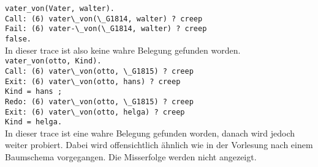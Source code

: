 \documentclass[11pt]{article}
\begin{document}
\verb|vater_von(Vater, walter).|\\
\verb|Call: (6) vater\_von(\_G1814, walter) ? creep|\\
\verb|Fail: (6) vater-\_von(\_G1814, walter) ? creep|\\
\verb|false.|\\

In dieser trace ist also keine wahre Belegung gefunden worden.\\

\verb|vater_von(otto, Kind).|\\
\verb|Call: (6) vater\_von(otto, \_G1815) ? creep|\\
\verb|Exit: (6) vater\_von(otto, hans) ? creep|\\
\verb|Kind = hans ;|\\
\verb|Redo: (6) vater\_von(otto, \_G1815) ? creep|\\
\verb|Exit: (6) vater\_von(otto, helga) ? creep|\\
\verb|Kind = helga.|\\

In dieser trace ist eine wahre Belegung gefunden worden,
danach wird jedoch weiter probiert.
Dabei wird offensichtlich ähnlich wie in der Vorlesung nach einem Baumschema vorgegangen.
Die Misserfolge werden nicht angezeigt.
\end{document}
